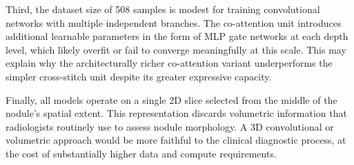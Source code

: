 Third, the dataset size of 508 samples is modest for training convolutional networks with multiple independent branches. The co-attention unit introduces additional learnable parameters in the form of MLP gate networks at each depth level, which likely overfit or fail to converge meaningfully at this scale. This may explain why the architecturally richer co-attention variant underperforms the simpler cross-stitch unit despite its greater expressive capacity.

Finally, all models operate on a single 2D slice selected from the middle of the nodule's spatial extent. This representation discards volumetric information that radiologists routinely use to assess nodule morphology. A 3D convolutional or volumetric approach would be more faithful to the clinical diagnostic process, at the cost of substantially higher data and compute requirements.